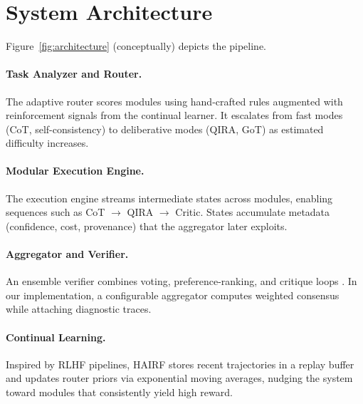 \documentclass[11pt]{article}
\begin{document}
\section{System Architecture}
\label{sec:architecture}
Figure~\ref{fig:architecture} (conceptually) depicts the pipeline.

\paragraph{Task Analyzer and Router.}
The adaptive router scores modules using hand-crafted rules augmented with reinforcement signals from the continual learner.  It escalates from fast modes (CoT, self-consistency) to deliberative modes (QIRA, GoT) as estimated difficulty increases.

\paragraph{Modular Execution Engine.}
The execution engine streams intermediate states across modules, enabling sequences such as CoT $\rightarrow$ QIRA $\rightarrow$ Critic.  States accumulate metadata (confidence, cost, provenance) that the aggregator later exploits.

\paragraph{Aggregator and Verifier.}
An ensemble verifier combines voting, preference-ranking, and critique loops \citep{zhang2024cumulative}.  In our implementation, a configurable aggregator computes weighted consensus while attaching diagnostic traces.

\paragraph{Continual Learning.}
Inspired by RLHF pipelines, HAIRF stores recent trajectories in a replay buffer and updates router priors via exponential moving averages, nudging the system toward modules that consistently yield high reward.
\end{document}
